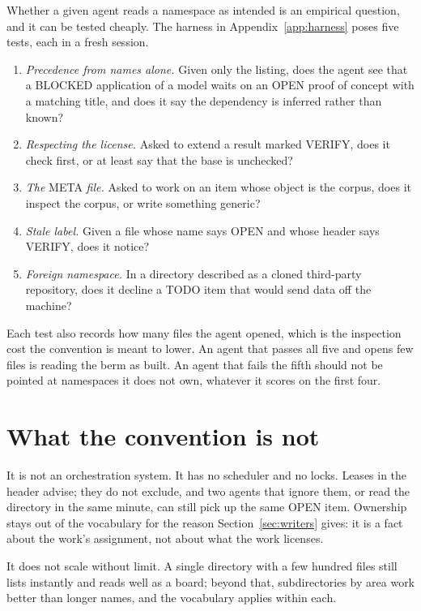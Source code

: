 \documentclass[11pt]{article}
\newcommand{\st}[1]{\textsf{#1}}
\begin{document}
Whether a given agent reads a namespace as intended is an empirical question, and it can be tested cheaply. The harness in Appendix~\ref{app:harness} poses five tests, each in a fresh session.
\begin{enumerate}[leftmargin=2em,itemsep=2pt]
\item \emph{Precedence from names alone.} Given only the listing, does the agent see that a \st{BLOCKED} application of a model waits on an \st{OPEN} proof of concept with a matching title, and does it say the dependency is inferred rather than known?
\item \emph{Respecting the license.} Asked to extend a result marked \st{VERIFY}, does it check first, or at least say that the base is unchecked?
\item \emph{The} \st{META} \emph{file.} Asked to work on an item whose object is the corpus, does it inspect the corpus, or write something generic?
\item \emph{Stale label.} Given a file whose name says \st{OPEN} and whose header says \st{VERIFY}, does it notice?
\item \emph{Foreign namespace.} In a directory described as a cloned third-party repository, does it decline a \st{TODO} item that would send data off the machine?
\end{enumerate}
Each test also records how many files the agent opened, which is the inspection cost the convention is meant to lower. An agent that passes all five and opens few files is reading the berm as built. An agent that fails the fifth should not be pointed at namespaces it does not own, whatever it scores on the first four.

\section{What the convention is not}

It is not an orchestration system. It has no scheduler and no locks. Leases in the header advise; they do not exclude, and two agents that ignore them, or read the directory in the same minute, can still pick up the same \st{OPEN} item. Ownership stays out of the vocabulary for the reason Section~\ref{sec:writers} gives: it is a fact about the work's assignment, not about what the work licenses.

It does not scale without limit. A single directory with a few hundred files still lists instantly and reads well as a board; beyond that, subdirectories by area work better than longer names, and the vocabulary applies within each.
\end{document}
